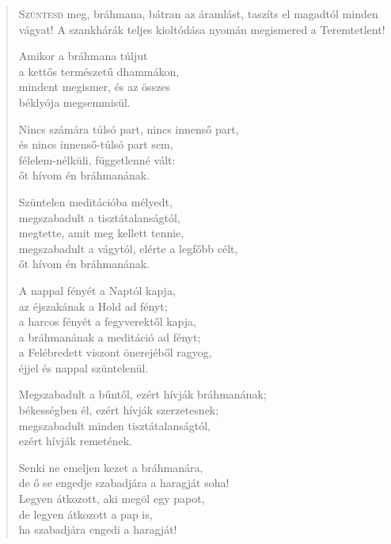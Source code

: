 
\vspace*{-\baselineskip}
\begin{verse}

{\par%
\lettrine{S}{züntesd} {\LettrineTextFont meg, bráhmana, bátran az áramlást,}\newline
taszíts el magadtól minden vágyat!\newline
A szankhárák teljes kioltódása nyomán\verselinebreak
megismered a Teremtetlent!
\par}

 Amikor a bráhmana túljut\\
a kettős természetű dhammákon,\\
mindent megismer, és az összes\\
béklyója megsemmisül.

 Nincs számára túlsó part, nincs innenső part,\\
és nincs innenső-túlsó part sem,\\
félelem-nélküli, függetlenné vált:\\
őt hívom én bráhmanának.

 Szüntelen meditációba mélyedt,\\
megszabadult a tisztátalanságtól,\\
megtette, amit meg kellett tennie,\\
megszabadult a vágytól, elérte a legfőbb célt,\\
őt hívom én bráhmanának.

 A nappal fényét a Naptól kapja,\\
az éjszakának a Hold ad fényt;\\
a harcos fényét a fegyverektől kapja,\\
a bráhmanának a meditáció ad fényt;\\
a Felébredett viszont önerejéből ragyog,\\
éjjel és nappal szüntelenül.

 Megszabadult a bűntől, ezért hívják bráhmanának;\\
békességben él, ezért hívják szerzetesnek;\\
megszabadult minden tisztátalanságtól,\\
ezért hívják remetének.

 Senki ne emeljen kezet a bráhmanára,\\
de ő se engedje szabadjára a haragját soha!\\
Legyen átkozott, aki megöl egy papot,\\
de legyen átkozott a pap is,\\
ha szabadjára engedi a haragját!


\end{verse}
